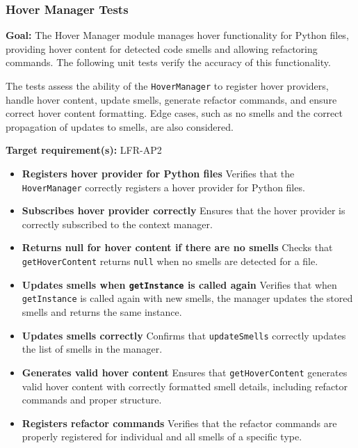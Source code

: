 \documentclass[12pt, titlepage]{article}
\begin{document}
\subsubsection{Hover Manager Tests}

\textbf{Goal:} The Hover Manager module manages hover functionality for Python files, providing hover content for detected code smells and allowing refactoring commands. The following unit tests verify the accuracy of this functionality.

The tests assess the ability of the \texttt{HoverManager} to register hover providers, handle hover content, update smells, generate refactor commands, and ensure correct hover content formatting. Edge cases, such as no smells and the correct propagation of updates to smells, are also considered.

\textbf{Target requirement(s):}  LFR-AP2 ~\cite{SRS} \\

\begin{itemize}
\item \textbf{Registers hover provider for Python files} \newline
Verifies that the \texttt{HoverManager} correctly registers a hover provider for Python files.

\item \textbf{Subscribes hover provider correctly} \newline
Ensures that the hover provider is correctly subscribed to the context manager.

\item \textbf{Returns null for hover content if there are no smells} \newline
Checks that \texttt{getHoverContent} returns \texttt{null} when no smells are detected for a file.

\item \textbf{Updates smells when \texttt{getInstance} is called again} \newline
Verifies that when \texttt{getInstance} is called again with new smells, the manager updates the stored smells and returns the same instance.

\item \textbf{Updates smells correctly} \newline
Confirms that \texttt{updateSmells} correctly updates the list of smells in the manager.

\item \textbf{Generates valid hover content} \newline
Ensures that \texttt{getHoverContent} generates valid hover content with correctly formatted smell details, including refactor commands and proper structure.

\item \textbf{Registers refactor commands} \newline
Verifies that the refactor commands are properly registered for individual and all smells of a specific type.
\end{itemize}
\end{document}
